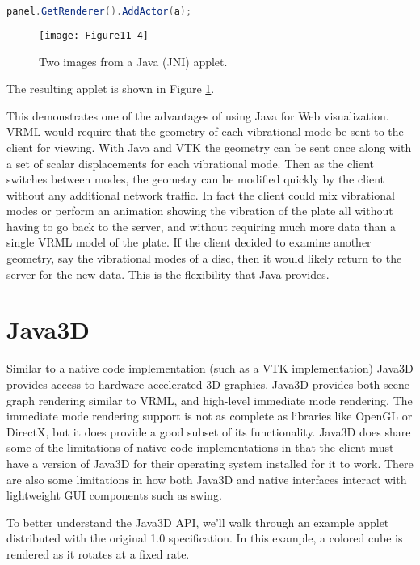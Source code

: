 \begin{lstlisting}[language=Java, caption={}, numbers=none, frame=none]
panel.GetRenderer().AddActor(a);
\end{lstlisting}

\begin{figure}[!htb]
  \centering
  \texttt{[image: Figure11-4]}\\
  \caption{Two images from a Java (JNI) applet.}\label{fig:Figure11-4}
\end{figure}


The resulting applet is shown in Figure \ref{fig:Figure11-4}.

This demonstrates one of the advantages of using Java for Web visualization. VRML would require that the geometry of each vibrational mode be sent to the client for viewing. With Java and VTK the geometry can be sent once along with a set of scalar displacements for each vibrational mode. Then as the client switches between modes, the geometry can be modified quickly by the client without any additional network traffic. In fact the client could mix vibrational modes or perform an animation showing the vibration of the plate all without having to go back to the server, and without requiring much more data than a single VRML model of the plate. If the client decided to examine another geometry, say the vibrational modes of a disc, then it would likely return to the server for the new data. This is the flexibility that Java provides.

\section{Java3D}

Similar to a native code implementation (such as a VTK implementation) Java3D provides access to hardware accelerated 3D graphics. Java3D provides both scene graph rendering similar to VRML, and high-level immediate mode rendering. The immediate mode rendering support is not as complete as libraries like OpenGL or DirectX, but it does provide a good subset of its functionality. Java3D does share some of the limitations of native code implementations in that the client must have a version of Java3D for their operating system installed for it to work. There are also some limitations in how both Java3D and native interfaces interact with lightweight GUI components such as swing.

To better understand the Java3D API, we’ll walk through an example applet distributed with the original 1.0 specification. In this example, a colored cube is rendered as it rotates at a fixed rate.

